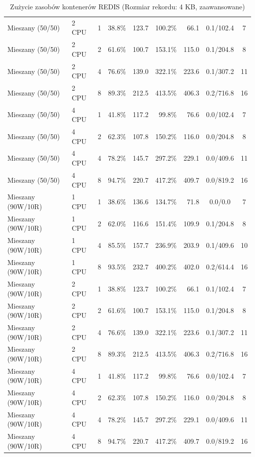 \begin{table}[ht]
{\begin{tabular}{llcrrrrcc}
Mieszany (50/50) & 2 CPU & 1 & 38.8\% & 123.7 & 100.2\% & 66.1 & 0.1/102.4 & 7 \\
Mieszany (50/50) & 2 CPU & 2 & 61.6\% & 100.7 & 153.1\% & 115.0 & 0.1/204.8 & 8 \\
Mieszany (50/50) & 2 CPU & 4 & 76.6\% & 139.0 & 322.1\% & 223.6 & 0.1/307.2 & 11 \\
Mieszany (50/50) & 2 CPU & 8 & 89.3\% & 212.5 & 413.5\% & 406.3 & 0.2/716.8 & 16 \\
Mieszany (50/50) & 4 CPU & 1 & 41.8\% & 117.2 & 99.8\% & 76.6 & 0.0/102.4 & 7 \\
Mieszany (50/50) & 4 CPU & 2 & 62.3\% & 107.8 & 150.2\% & 116.0 & 0.0/204.8 & 8 \\
Mieszany (50/50) & 4 CPU & 4 & 78.2\% & 145.7 & 297.2\% & 229.1 & 0.0/409.6 & 11 \\
Mieszany (50/50) & 4 CPU & 8 & 94.7\% & 220.7 & 417.2\% & 409.7 & 0.0/819.2 & 16 \\
Mieszany (90W/10R) & 1 CPU & 1 & 38.6\% & 136.6 & 134.7\% & 71.8 & 0.0/0.0 & 7 \\
Mieszany (90W/10R) & 1 CPU & 2 & 62.0\% & 116.6 & 151.4\% & 109.9 & 0.1/204.8 & 8 \\
Mieszany (90W/10R) & 1 CPU & 4 & 85.5\% & 157.7 & 236.9\% & 203.9 & 0.1/409.6 & 10 \\
Mieszany (90W/10R) & 1 CPU & 8 & 93.5\% & 232.7 & 400.2\% & 402.0 & 0.2/614.4 & 16 \\
Mieszany (90W/10R) & 2 CPU & 1 & 38.8\% & 123.7 & 100.2\% & 66.1 & 0.1/102.4 & 7 \\
Mieszany (90W/10R) & 2 CPU & 2 & 61.6\% & 100.7 & 153.1\% & 115.0 & 0.1/204.8 & 8 \\
Mieszany (90W/10R) & 2 CPU & 4 & 76.6\% & 139.0 & 322.1\% & 223.6 & 0.1/307.2 & 11 \\
Mieszany (90W/10R) & 2 CPU & 8 & 89.3\% & 212.5 & 413.5\% & 406.3 & 0.2/716.8 & 16 \\
Mieszany (90W/10R) & 4 CPU & 1 & 41.8\% & 117.2 & 99.8\% & 76.6 & 0.0/102.4 & 7 \\
Mieszany (90W/10R) & 4 CPU & 2 & 62.3\% & 107.8 & 150.2\% & 116.0 & 0.0/204.8 & 8 \\
Mieszany (90W/10R) & 4 CPU & 4 & 78.2\% & 145.7 & 297.2\% & 229.1 & 0.0/409.6 & 11 \\
Mieszany (90W/10R) & 4 CPU & 8 & 94.7\% & 220.7 & 417.2\% & 409.7 & 0.0/819.2 & 16 \\
\bottomrule
\end{tabular}%
}
\caption{Zużycie zasobów kontenerów REDIS (Rozmiar rekordu: 4 KB, zaawansowane)}
\label{tab:resources_redis_medium_0}
\end{table}
